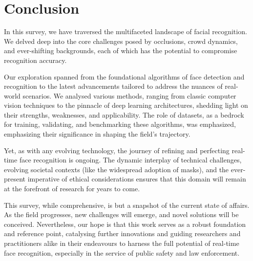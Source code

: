 \section{Conclusion} \label{section:conclusion}

In this survey, we have traversed the multifaceted landscape of facial recognition. We delved deep into the core challenges posed by occlusions, crowd dynamics, and ever-shifting backgrounds, each of which has the potential to compromise recognition accuracy.

Our exploration spanned from the foundational algorithms of face detection and recognition to the latest advancements tailored to address the nuances of real-world scenarios. We analysed various methods, ranging from classic computer vision techniques to the pinnacle of deep learning architectures, shedding light on their strengths, weaknesses, and applicability. The role of datasets, as a bedrock for training, validating, and benchmarking these algorithms, was emphasized, emphasizing their significance in shaping the field's trajectory.

Yet, as with any evolving technology, the journey of refining and perfecting real-time face recognition is ongoing. The dynamic interplay of technical challenges, evolving societal contexts (like the widespread adoption of masks), and the ever-present imperative of ethical considerations ensures that this domain will remain at the forefront of research for years to come.

This survey, while comprehensive, is but a snapshot of the current state of affairs. As the field progresses, new challenges will emerge, and novel solutions will be conceived. Nevertheless, our hope is that this work serves as a robust foundation and reference point, catalysing further innovations and guiding researchers and practitioners alike in their endeavours to harness the full potential of real-time face recognition, especially in the service of public safety and law enforcement.